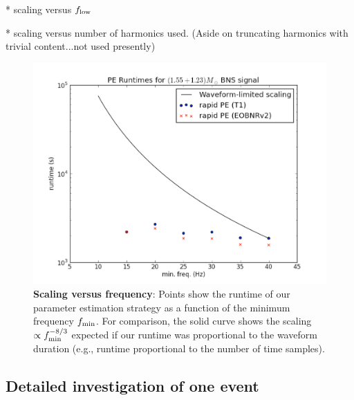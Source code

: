 \documentclass[twocolumn,prd,nofootinbib]{revtex4}
\newcommand\ForInternalReference[1]{#1}
\begin{document}
* scaling versus $f_{\rm low}$

\ForInternalReference{
* scaling versus number of harmonics used.  (Aside on truncating harmonics with trivial content...not used presently)
}

\begin{figure}
\includegraphics[width=\columnwidth]{../Figures/fig-manual-RuntimeScalingVsFmin}
\caption{\textbf{Scaling versus frequency}: Points show the runtime of our parameter estimation strategy as a function
  of the minimum frequency $f_{\rm min}$.  For comparison, the solid curve shows the scaling $\propto f_{\rm
    min}^{-8/3}$ expected if our runtime was proportional to the waveform duration (e.g., runtime proportional to the
  number of time samples). 
}
\end{figure}

\subsection{Detailed investigation of one event}
%    
\end{document}

